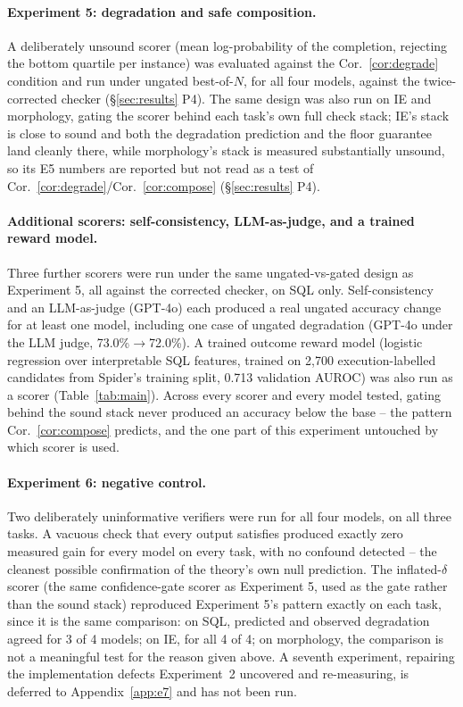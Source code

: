 \documentclass[11pt]{article}
\begin{document}
\paragraph{Experiment 5: degradation and safe composition.} A deliberately unsound scorer (mean log-probability of the completion, rejecting the bottom quartile per instance) was evaluated against the Cor.~\ref{cor:degrade} condition and run under ungated best-of-$N$, for all four models, against the twice-corrected checker (\S\ref{sec:results} P4). The same design was also run on IE and morphology, gating the scorer behind each task's own full check stack; IE's stack is close to sound and both the degradation prediction and the floor guarantee land cleanly there, while morphology's stack is measured substantially unsound, so its E5 numbers are reported but not read as a test of Cor.~\ref{cor:degrade}/Cor.~\ref{cor:compose} (\S\ref{sec:results} P4).

\paragraph{Additional scorers: self-consistency, LLM-as-judge, and a trained reward model.} Three further scorers were run under the same ungated-vs-gated design as Experiment 5, all against the corrected checker, on SQL only. Self-consistency and an LLM-as-judge (GPT-4o) each produced a real ungated accuracy change for at least one model, including one case of ungated degradation (GPT-4o under the LLM judge, 73.0\%$\to$72.0\%). A trained outcome reward model (logistic regression over interpretable SQL features, trained on 2{,}700 execution-labelled candidates from Spider's training split, 0.713 validation AUROC) was also run as a scorer (Table~\ref{tab:main}). Across every scorer and every model tested, gating behind the sound stack never produced an accuracy below the base -- the pattern Cor.~\ref{cor:compose} predicts, and the one part of this experiment untouched by which scorer is used.

\paragraph{Experiment 6: negative control.} Two deliberately uninformative verifiers were run for all four models, on all three tasks. A vacuous check that every output satisfies produced exactly zero measured gain for every model on every task, with no confound detected -- the cleanest possible confirmation of the theory's own null prediction. The inflated-$\delta$ scorer (the same confidence-gate scorer as Experiment 5, used as the gate rather than the sound stack) reproduced Experiment 5's pattern exactly on each task, since it is the same comparison: on SQL, predicted and observed degradation agreed for 3 of 4 models; on IE, for all 4 of 4; on morphology, the comparison is not a meaningful test for the reason given above. A seventh experiment, repairing the implementation defects Experiment~2 uncovered and re-measuring, is deferred to Appendix~\ref{app:e7} and has not been run.
\end{document}
